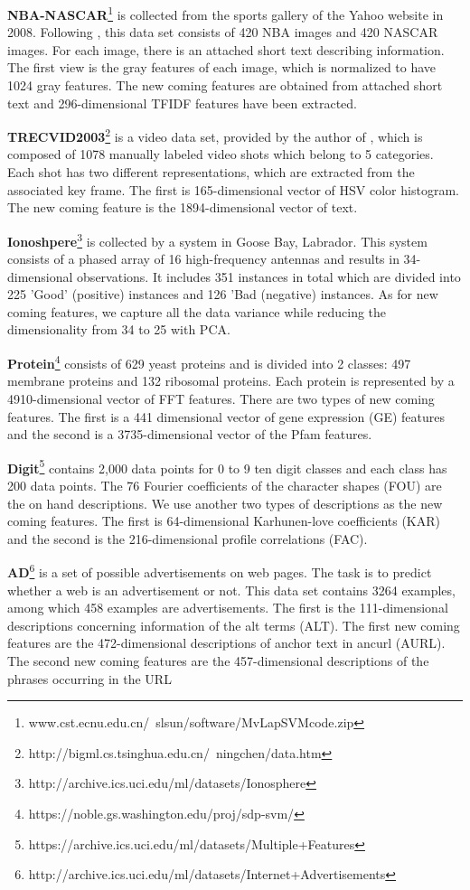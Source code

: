\documentclass[10pt,journal,compsoc]{IEEEtran}
\begin{document}
\textbf{NBA-NASCAR}\footnote{www.cst.ecnu.edu.cn/~slsun/software/MvLapSVMcode.zip} is collected from the sports gallery of the Yahoo website in 2008. Following \cite{apin/XieS14}, this data set consists of 420 NBA images and 420 NASCAR images. For each image, there is an attached short text describing information.  The first view is the gray features of each image, which is normalized to have 1024 gray features. The new coming features are obtained from attached short text and 296-dimensional TFIDF features have been extracted.

\textbf{TRECVID2003}\footnote{http://bigml.cs.tsinghua.edu.cn/~ningchen/data.htm} is a video data set, provided by the author of \cite{ChenZSX12}, which is composed of 1078 manually labeled video shots which belong to 5 categories. Each shot has two different representations, which are extracted from the associated key frame. The first is 165-dimensional vector of HSV color histogram. The new coming feature is the 1894-dimensional vector of text.

\textbf{Ionoshpere}\footnote{http://archive.ics.uci.edu/ml/datasets/Ionosphere} is collected by a system in Goose Bay, Labrador. This system
consists of a phased array of 16 high-frequency antennas and results in 34-dimensional observations. It includes 351 instances in total which are divided into 225 'Good' (positive) instances and 126 'Bad (negative) instances. As for new coming features, we capture all the data variance while reducing the dimensionality from 34 to 25 with PCA.

\textbf{Protein}\footnote{https://noble.gs.washington.edu/proj/sdp-svm/} consists of 629 yeast proteins and is divided into 2 classes: 497 membrane proteins and 132 ribosomal proteins. Each protein is represented by a 4910-dimensional vector of FFT features. There are two types of new coming features. The first is a 441 dimensional vector of gene expression (GE) features and the second is a 3735-dimensional vector of the Pfam features.

\textbf{Digit}\footnote{https://archive.ics.uci.edu/ml/datasets/Multiple+Features} contains 2,000 data points for 0 to 9 ten digit classes and each class has 200 data points. The 76 Fourier coefficients of the character shapes (FOU) are the on hand descriptions. We use another two types of descriptions as the new coming features. The first is 64-dimensional Karhunen-love coefficients (KAR) and the second is the 216-dimensional profile correlations (FAC).

\textbf{AD}\footnote{http://archive.ics.uci.edu/ml/datasets/Internet+Advertisements} is a set of possible advertisements on web pages. The task is to predict whether a web is an advertisement or not. This data set contains 3264 examples, among which 458 examples are advertisements. The first is the 111-dimensional descriptions concerning information of the alt terms (ALT). The first new coming features are the 472-dimensional descriptions of anchor text in ancurl (AURL). The second new coming features are the 457-dimensional descriptions of the phrases occurring in the URL
\end{document}
